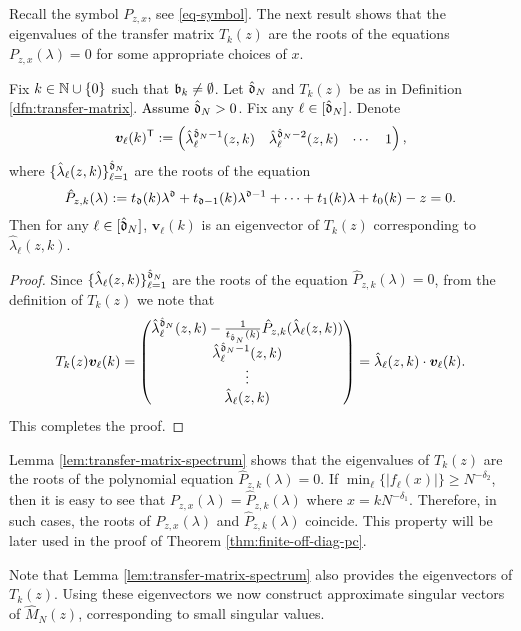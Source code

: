 \documentclass{amsart}
\numberwithin{equation}{section}
\def\corAB{}
\def\corOZ{}
\def\corABrev{\textcolor{black}}
\begin{document}
\corOZ{Recall the symbol $P_{z,x}$, see \eqref{eq-symbol}.}
The next result shows that the eigenvalues of the transfer matrix $T_k(z)$ are the roots of the equations $P_{z,x}(\lambda)=0$ for some appropriate choices of $x$.
\begin{lemma}\label{lem:transfer-matrix-spectrum}
Fix $k \in \mathbb N \cup \{0\}$ such that $\mathfrak{b}_k \ne \emptyset$. Let $\hat{\mathfrak{d}}_N$ and $T_k(z)$ be as in Definition \ref{dfn:transfer-matrix}. \corABrev{Assume $\hat{\mathfrak{d}}_N >0$}. Fix any $\ell \in [\hat{\mathfrak{d}}_N]$. Denote
\[
{\bm v}_{\ell}(k)^{\sf T}:= \begin{pmatrix} \hat{\lambda}^{
  \hat{\mathfrak{d}}_N-1}_\ell(z,k) & \hat{\lambda}_\ell^{\hat{\mathfrak{d}}_N-2}(z,k) & \cdots  & 1\end{pmatrix},
\]
where $\{\hat{\lambda}_\ell(z,k)\}_{\ell=1}^{\hat{\mathfrak{d}}_N}$ are the roots of the equation
\[\hat{P}_{z,k}(\lambda):=t_{\mathfrak{d}}(k)\lambda^{\mathfrak{d}}+ t_{\mathfrak{d}-1}(k) \lambda^{\mathfrak{d}-1}+ \cdots + t_1(k)\lambda + t_0(k)-z=0.
\]
Then for any $\ell \in[\hat{\mathfrak{d}}_N]$, ${\bm v}_\ell(k)$ is an eigenvector of $T_k(z)$ corresponding to $\hat{\lambda}_\ell(z,k)$.
\end{lemma}
\begin{proof}
Since $\{\hat{\lambda}_\ell(z,k)\}_{\ell=1}^{\hat{\mathfrak{d}}_N}$ are the roots of the equation $\hat{P}_{z,k}(\lambda)=0$, from the definition of \corAB{$T_k(z)$} we note that
\[
T_k(z) {\bm v}_\ell(k) = \begin{pmatrix} \hat{\lambda}_\ell^{\hat{\mathfrak{d}}_N}(z,k) - \frac{1}{t_{\hat{\mathfrak{d}}_N}(k)}\hat{P}_{z,k}(\hat{\lambda}_\ell(z,k)) \\ \hat{\lambda}_\ell^{\hat{\mathfrak{d}}_N-1}(z,k) \\ \vdots \\ \hat{\lambda}_\ell(z,k)\end{pmatrix} = \hat{\lambda}_\ell(z,k) \cdot {\bm v}_\ell(k).
\]
This completes the proof.
\end{proof}
Lemma \ref{lem:transfer-matrix-spectrum} shows that the eigenvalues of $T_k(z)$ are the roots of the polynomial equation $\hat{P}_{z,k}(\lambda)=0$. If $\min_\ell \{|f_\ell(x)|\} \ge N^{-\delta_2}$, then it is easy to see that $P_{z,x}(\lambda)=\hat{P}_{z,k}(\lambda)$ where $x=k N^{-\delta_1}$. Therefore, in such cases, the roots of $P_{z,x}(\lambda)$ and $\hat{P}_{z,k}(\lambda)$ coincide. This property will be later used in the proof of Theorem \ref{thm:finite-off-diag-pc}.

Note that Lemma \ref{lem:transfer-matrix-spectrum} also provides the eigenvectors of $T_k(z)$. Using these eigenvectors we now construct approximate singular vectors of $\hat{M}_N(z)$, corresponding to small singular values.
\end{document}
